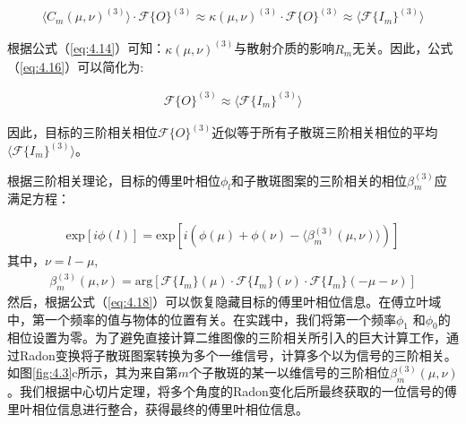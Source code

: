 \begin{equation}
\begin{aligned}
    \langle C_m(\mu,\nu)^{(3)} \rangle \cdot \mathcal{F}\{ O \}^{(3)} \approx \kappa(\mu,\nu)^{(3)}\cdot \mathcal{F}\{ O \}^{(3)} \approx   \langle \mathcal{F}\{ I_m \}^{(3)} \rangle
\end{aligned}
\label{eq:4.16}
\end{equation}

根据公式（\ref{eq:4.14}）可知：$\kappa(\mu,\nu)^{(3)}$与散射介质的影响$R_m$无关。因此，公式（\ref{eq:4.16}）可以简化为:

\begin{equation}
\begin{aligned}
   \mathcal{F}\{ O \}^{(3)} \approx   \langle \mathcal{F}\{ I_m \}^{(3)} \rangle
\end{aligned}
\label{eq:4.17}
\end{equation}

因此，目标的三阶相关相位$\mathcal{F}\{ O \}^{(3)}$近似等于所有子散斑三阶相关相位的平均$\langle \mathcal{F}\{ I_m \}^{(3)} \rangle$。

根据三阶相关理论，目标的傅里叶相位$\phi_{l}$和子散斑图案的三阶相关的相位$\beta_{m}^{(3)}$应满足方程：

\begin{equation}
\begin{aligned}
   \mbox{exp}[i\phi(l)]= \mbox{exp}\left[i(\phi(\mu)+\phi(\nu)- \langle {\beta_{m}^{(3)}(\mu,\nu)} \rangle)\right]
\end{aligned}
\label{eq:4.18}
\end{equation}其中，$\nu=l-\mu$,
\begin{equation}
\begin{aligned}
  {\beta_{m}^{(3)}(\mu,\nu)}= \mbox{arg}\left[\mathcal{F}\{I_m\}(\mu)\cdot \mathcal{F}\{I_m\}(\nu) \cdot \mathcal{F}\{I_m\}(-\mu-\nu)\right]
\end{aligned}
\label{eq:4.19}
\end{equation}
然后，根据公式（\ref{eq:4.18}）可以恢复隐藏目标的傅里叶相位信息。在傅立叶域中，第一个频率的值与物体的位置有关。在实践中，我们将第一个频率$\phi_{1}$ 和$\phi_{0}$的相位设置为零。为了避免直接计算二维图像的三阶相关所引入的巨大计算工作，通过Radon变换\cite{ayers_knoxthompson_1988}将子散斑图案转换为多个一维信号，计算多个以为信号的三阶相关。如图\ref{fig:4.3}c所示，其为来自第$m$个子散斑的某一以维信号的三阶相位${\beta_{m}^{(3)}(\mu,\nu)}$。我们根据中心切片定理，将多个角度的Radon变化后所最终获取的一位信号的傅里叶相位信息进行整合，获得最终的傅里叶相位信息。

